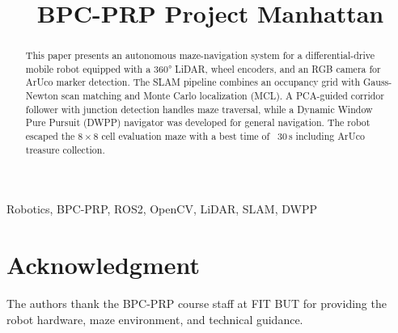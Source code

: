 \documentclass[conference]{IEEEtran}
\begin{document}
\title{BPC-PRP Project Manhattan}

\author{
\and
{}
}

\maketitle

\begin{abstract}
This paper presents an autonomous maze-navigation system for a differential-drive mobile robot
equipped with a 360° LiDAR, wheel encoders, and an RGB camera for ArUco marker detection.
The SLAM pipeline combines an occupancy grid with Gauss-Newton scan matching and Monte Carlo
localization (MCL). A PCA-guided corridor follower with junction detection handles maze
traversal, while a Dynamic Window Pure Pursuit (DWPP) navigator was developed for general
navigation. The robot escaped the $8{\times}8$ cell evaluation maze with a best time of ~30\,s
including ArUco treasure collection.
\end{abstract}

\begin{IEEEkeywords}
Robotics, BPC-PRP, ROS2, OpenCV, LiDAR, SLAM, DWPP
\end{IEEEkeywords}







\section*{Acknowledgment}
The authors thank the BPC-PRP course staff at FIT BUT for providing the robot hardware, maze
environment, and technical guidance.

\printbibliography
\end{document}
